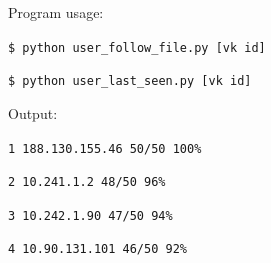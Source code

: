 Program usage:

\texttt{\$ python user{\_}follow{\_}file.py [vk id]}

\texttt{\$ python user{\_}last{\_}seen.py [vk id]}

Output:

\texttt{1 188.130.155.46 	50/50 100\%}

\texttt{2 10.241.1.2    	48/50 96\%}

\texttt{3 10.242.1.90   	47/50 94\%}

\texttt{4 10.90.131.101 	46/50 92\%}


\begin{figure} 
\end{figure}



